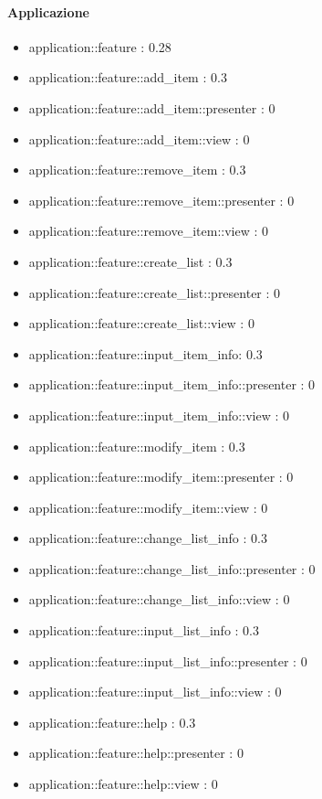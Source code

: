 \paragraph{Applicazione}

\begin{itemize}

\item application::feature : 0.28
\item application::feature::add\_item : 0.3
\item application::feature::add\_item::presenter : 0
\item application::feature::add\_item::view : 0
\item application::feature::remove\_item : 0.3
\item application::feature::remove\_item::presenter : 0
\item application::feature::remove\_item::view : 0
\item application::feature::create\_list : 0.3
\item application::feature::create\_list::presenter : 0
\item application::feature::create\_list::view : 0
\item application::feature::input\_item\_info: 0.3
\item application::feature::input\_item\_info::presenter : 0
\item application::feature::input\_item\_info::view : 0
\item application::feature::modify\_item : 0.3
\item application::feature::modify\_item::presenter : 0
\item application::feature::modify\_item::view : 0
\item application::feature::change\_list\_info : 0.3
\item application::feature::change\_list\_info::presenter : 0
\item application::feature::change\_list\_info::view : 0
\item application::feature::input\_list\_info : 0.3
\item application::feature::input\_list\_info::presenter : 0
\item application::feature::input\_list\_info::view : 0
\item application::feature::help : 0.3
\item application::feature::help::presenter : 0
\item application::feature::help::view : 0

\end{itemize}
